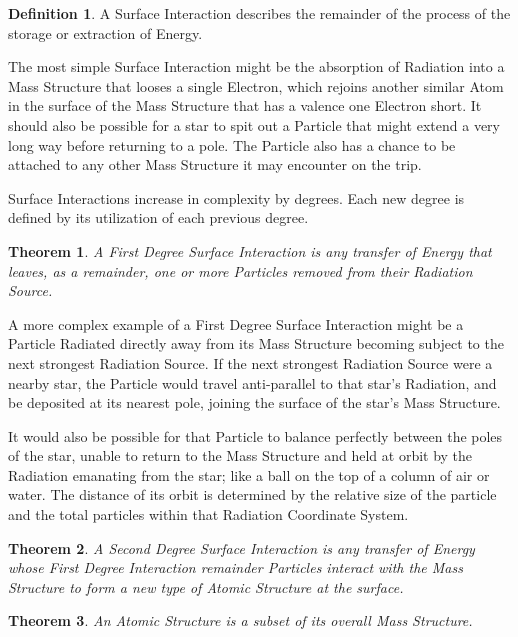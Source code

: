 \documentclass[12pt]{article}
\theoremstyle{plain}
\newtheorem{theorem}{Theorem}
\theoremstyle{definition}
\newtheorem{definition}{Definition}
\begin{document}
\begin{definition}
A Surface Interaction describes the remainder of the process of the storage or extraction of Energy.
\end{definition}

The most simple Surface Interaction might be the absorption of Radiation into a Mass Structure that looses a single Electron, which rejoins another similar Atom in the surface of the Mass Structure that has a valence one Electron short. It should also be possible for a star to spit out a Particle that might extend a very long way before returning to a pole. The Particle also has a chance to be attached to any other Mass Structure it may encounter on the trip.

Surface Interactions increase in complexity by degrees. Each new degree is defined by its utilization of each previous degree.

\begin{theorem}
A First Degree Surface Interaction is any transfer of Energy that leaves, as a remainder, one or more Particles removed from their Radiation Source.
\end{theorem}

A more complex example of a First Degree Surface Interaction might be a Particle Radiated directly away from its Mass Structure becoming subject to the next strongest Radiation Source. If the next strongest Radiation Source were a nearby star, the Particle would travel anti-parallel to that star's Radiation, and be deposited at its nearest pole, joining the surface of the star's Mass Structure.

It would also be possible for that Particle to balance perfectly between the poles of the star, unable to return to the Mass Structure and held at orbit by the Radiation emanating from the star; like a ball on the top of a column of air or water. The distance of its orbit is determined by the relative size of the particle and the total particles within that Radiation Coordinate System.

\begin{theorem}
A Second Degree Surface Interaction is any transfer of Energy whose First Degree Interaction remainder Particles interact with the Mass Structure to form a new type of Atomic Structure at the surface.
\end{theorem}

\begin{theorem}
An Atomic Structure is a subset of its overall Mass Structure.
\end{theorem}
\end{document}
